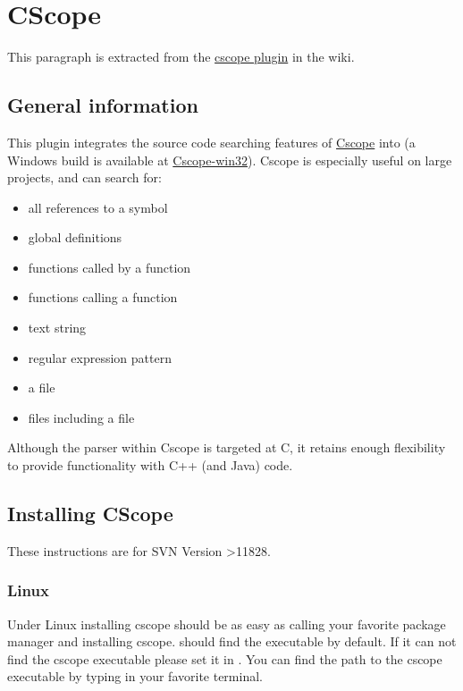 \section{CScope}\label{sec:cscope}

This paragraph is extracted from the \href{https://wiki.codeblocks.org/index.php/Cscope_plugin}{cscope plugin} in the wiki.

\subsection{General information}

This plugin integrates the source code searching features of \href{https://cscope.sourceforge.net/}{Cscope} into \codeblocks (a Windows build is available at \href{https://code.google.com/p/cscope-win32/}{Cscope-win32}). Cscope is especially useful on large projects, and can search for:

\begin{itemize}[noitemsep]
\item all references to a symbol
\item global definitions
\item functions called by a function
\item functions calling a function
\item text string
\item regular expression pattern
\item a file
\item files including a file
\end{itemize}

Although the parser within Cscope is targeted at C, it retains enough flexibility to provide functionality with C++ (and Java) code.

\subsection{Installing CScope}

These instructions are for \codeblocks SVN Version \textgreater 11828.

\subsubsection{Linux}

Under Linux installing cscope should be as easy as calling your favorite package manager and installing cscope. \codeblocks should find the executable by default. If it can not find the cscope executable please set it in . You can find the path to the cscope executable by typing  in your favorite terminal.

